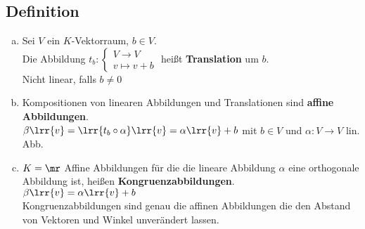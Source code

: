 \subsection{Definition}
	\begin{enumerate}[a)]
		\item Sei $V$ ein $K$-Vektorraum, $b\in V$.\\
			Die Abbildung $t_b:\begin{cases}V\rightarrow V\\v\mapsto v+b\end{cases}$ heißt \textbf{Translation} um $b$.\\
			Nicht linear, falls $b\neq 0$
		\item Kompositionen von linearen Abbildungen und Translationen sind \textbf{affine Abbildungen}.\\
			$\beta\lrr{v}=\lrr{t_b\circ\alpha}\lrr{v}=\alpha\lrr{v}+b$ mit $b\in V$ und $\alpha:V\rightarrow V$ lin. Abb.
		\item $K=\mr$ Affine Abbildungen für die die lineare Abbildung $\alpha$ eine orthogonale Abbildung ist, heißen \textbf{Kongruenzabbildungen}.\\
			$\beta\lrr{v}=\alpha\lrr{v}+b$\\
			Kongruenzabbildungen sind genau die affinen Abbildungen die den Abstand von Vektoren und Winkel unverändert lassen.
	\end{enumerate}
	
